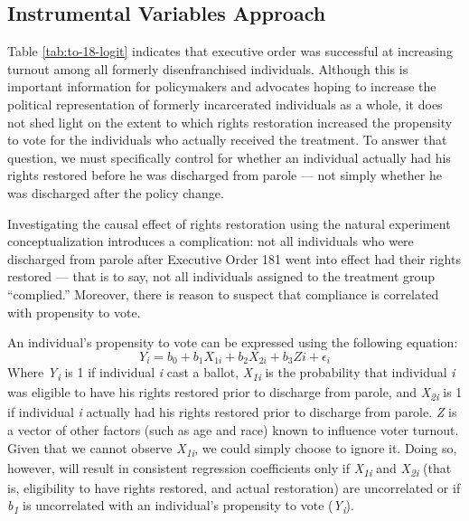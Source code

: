 \documentclass[
  12pt,
]{article}
\begin{document}
\hypertarget{instrumental-variables-approach}{%
\subsection*{Instrumental Variables Approach}\label{instrumental-variables-approach}}

Table \ref{tab:to-18-logit} indicates that executive order was successful at increasing turnout among all formerly disenfranchised individuals. Although this is important information for policymakers and advocates hoping to increase the political representation of formerly incarcerated individuals as a whole, it does not shed light on the extent to which rights restoration increased the propensity to vote for the individuals who actually received the treatment. To answer that question, we must specifically control for whether an individual actually had his rights restored before he was discharged from parole --- not simply whether he was discharged after the policy change.

Investigating the causal effect of rights restoration using the natural experiment conceptualization introduces a complication: not all individuals who were discharged from parole after Executive Order 181 went into effect had their rights restored --- that is to say, not all individuals assigned to the treatment group ``complied.'' Moreover, there is reason to suspect that compliance is correlated with propensity to vote.

An individual's propensity to vote can be expressed using the following equation:
\[ Y_i =  b_0 + b_{1}X_{1i} + b_{2}X_{2i} + b_{3}Z{i}+ \epsilon_{i} \]
Where \emph{Y\textsubscript{i}} is 1 if individual \emph{i} cast a ballot, \emph{X\textsubscript{1i}} is the probability that individual \emph{i} was eligible to have his rights restored prior to discharge from parole, and \emph{X\textsubscript{2i}} is 1 if individual \emph{i} actually had his rights restored prior to discharge from parole. \emph{Z} is a vector of other factors (such as age and race) known to influence voter turnout. Given that we cannot observe \emph{X\textsubscript{1i}}, we could simply choose to ignore it. Doing so, however, will result in consistent regression coefficients only if \emph{X\textsubscript{1i}} and \emph{X\textsubscript{2i}} (that is, eligibility to have rights restored, and actual restoration) are uncorrelated or if \emph{b\textsubscript{1}} is uncorrelated with an individual's propensity to vote (\emph{Y\textsubscript{i}}).
\end{document}
